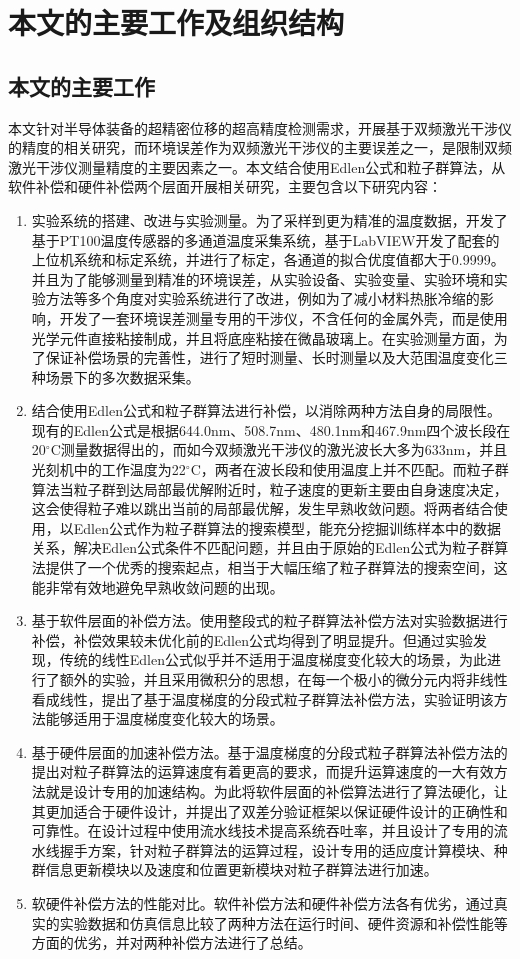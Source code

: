 \section{本文的主要工作及组织结构}
\subsection{本文的主要工作}
本文针对半导体装备的超精密位移的超高精度检测需求，开展基于双频激光干涉仪的精度的相关研究，而环境误差作为双频激光干涉仪的主要误差之一，是限制双频激光干涉仪测量精度的主要因素之一。本文结合使用Edlen公式和粒子群算法，从软件补偿和硬件补偿两个层面开展相关研究，主要包含以下研究内容：
\begin{enumerate}
    \item 实验系统的搭建、改进与实验测量。为了采样到更为精准的温度数据，开发了基于PT100温度传感器的多通道温度采集系统，基于LabVIEW开发了配套的上位机系统和标定系统，并进行了标定，各通道的拟合优度值都大于0.9999。并且为了能够测量到精准的环境误差，从实验设备、实验变量、实验环境和实验方法等多个角度对实验系统进行了改进，例如为了减小材料热胀冷缩的影响，开发了一套环境误差测量专用的干涉仪，不含任何的金属外壳，而是使用光学元件直接粘接制成，并且将底座粘接在微晶玻璃上。在实验测量方面，为了保证补偿场景的完善性，进行了短时测量、长时测量以及大范围温度变化三种场景下的多次数据采集。
    \item 结合使用Edlen公式和粒子群算法进行补偿，以消除两种方法自身的局限性。现有的Edlen公式是根据644.0nm、508.7nm、480.1nm和467.9nm四个波长段在20$^{\circ}\mathrm{C}$测量数据得出的，而如今双频激光干涉仪的激光波长大多为633nm，并且光刻机中的工作温度为22$^{\circ} \mathrm{C}$，两者在波长段和使用温度上并不匹配。而粒子群算法当粒子群到达局部最优解附近时，粒子速度的更新主要由自身速度决定，这会使得粒子难以跳出当前的局部最优解，发生早熟收敛问题。将两者结合使用，以Edlen公式作为粒子群算法的搜索模型，能充分挖掘训练样本中的数据关系，解决Edlen公式条件不匹配问题，并且由于原始的Edlen公式为粒子群算法提供了一个优秀的搜索起点，相当于大幅压缩了粒子群算法的搜索空间，这能非常有效地避免早熟收敛问题的出现。
    \item 基于软件层面的补偿方法。使用整段式的粒子群算法补偿方法对实验数据进行补偿，补偿效果较未优化前的Edlen公式均得到了明显提升。但通过实验发现，传统的线性Edlen公式似乎并不适用于温度梯度变化较大的场景，为此进行了额外的实验，并且采用微积分的思想，在每一个极小的微分元内将非线性看成线性，提出了基于温度梯度的分段式粒子群算法补偿方法，实验证明该方法能够适用于温度梯度变化较大的场景。
    \item 基于硬件层面的加速补偿方法。基于温度梯度的分段式粒子群算法补偿方法的提出对粒子群算法的运算速度有着更高的要求，而提升运算速度的一大有效方法就是设计专用的加速结构。为此将软件层面的补偿算法进行了算法硬化，让其更加适合于硬件设计，并提出了双差分验证框架以保证硬件设计的正确性和可靠性。在设计过程中使用流水线技术提高系统吞吐率，并且设计了专用的流水线握手方案，针对粒子群算法的运算过程，设计专用的适应度计算模块、种群信息更新模块以及速度和位置更新模块对粒子群算法进行加速。
    \item 软硬件补偿方法的性能对比。软件补偿方法和硬件补偿方法各有优劣，通过真实的实验数据和仿真信息比较了两种方法在运行时间、硬件资源和补偿性能等方面的优劣，并对两种补偿方法进行了总结。
  \end{enumerate}
